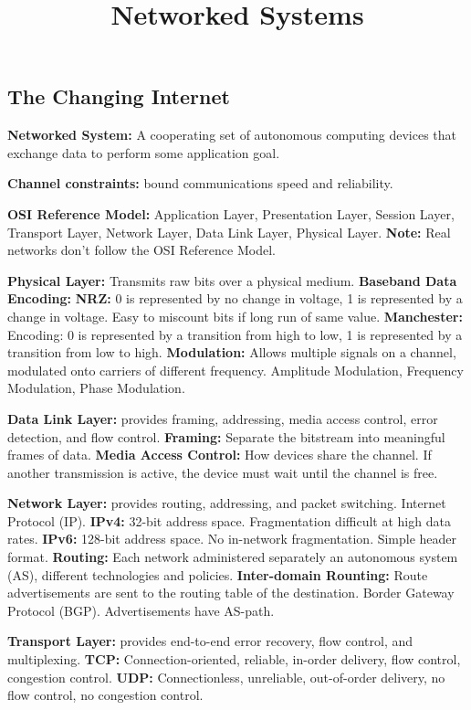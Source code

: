 \documentclass{article}
\title{Networked Systems}
\author{}
\date{}
\begin{document}
\footnotesize

\subsection*{The Changing Internet}

\textbf{Networked System:} A cooperating set of autonomous computing devices that exchange data to perform some application goal.

\textbf{Channel constraints:} bound communications speed and reliability.

\textbf{OSI Reference Model:} Application Layer, Presentation Layer, Session Layer, Transport Layer, Network Layer, Data Link Layer, Physical Layer.
\textbf{Note:} Real networks don't follow the OSI Reference Model.

\textbf{Physical Layer:} Transmits raw bits over a physical medium.
\textbf{Baseband Data Encoding:}
\textbf{NRZ:} 0 is represented by no change in voltage, 1 is represented by a change in voltage. Easy to miscount bits if long run of same value.
\textbf{Manchester:} Encoding: 0 is represented by a transition from high to low, 1 is represented by a transition from low to high.
\textbf{Modulation:} Allows multiple signals on a channel, modulated onto carriers of different frequency. Amplitude Modulation, Frequency Modulation, Phase Modulation.

\textbf{Data Link Layer:} provides framing, addressing, media access control, error detection, and flow control.
\textbf{Framing:} Separate the bitstream into meaningful frames of data.
\textbf{Media Access Control:} How devices share the channel. If another transmission is active, the device must wait until the channel is free.


\textbf{Network Layer:} provides routing, addressing, and packet switching. Internet Protocol (IP).
\textbf{IPv4:} 32-bit address space. Fragmentation difficult at high data rates.
\textbf{IPv6:} 128-bit address space. No in-network fragmentation. Simple header format.
\textbf{Routing:} Each network administered separately \- an autonomous system (AS), different technologies and policies.
\textbf{Inter-domain Rounting:} Route advertisements are sent to the routing table of the destination. Border Gateway Protocol (BGP). Advertisements have AS-path.


\textbf{Transport Layer:} provides end-to-end error recovery, flow control, and multiplexing.
\textbf{TCP:} Connection-oriented, reliable, in-order delivery, flow control, congestion control.
\textbf{UDP:} Connectionless, unreliable, out-of-order delivery, no flow control, no congestion control.
\end{document}
